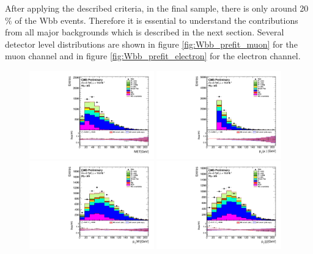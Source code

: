 After applying the described criteria, in the final sample, there is only around 20$\%$ of the Wbb events. Therefore it is essential to understand the contributions from all major backgrounds which is described in the next section. Several detector level distributions are shown in figure \ref{fig:Wbb_prefit_muon} for the muon channel and in figure \ref{fig:Wbb_prefit_electron} for the electron channel. 
\begin{figure}[htbp]
	\centering
		\includegraphics[width=0.48\textwidth]{Figures/Results/Muon/prefit/Wbb_GetMET_doQCD1.pdf}
		\includegraphics[width=0.48\textwidth]{Figures/Results/Muon/prefit/Wbb_vLepton_pt_doQCD1.pdf}
		\includegraphics[width=0.48\textwidth]{Figures/Results/Muon/prefit/Wbb_GetWpt_doQCD1.pdf}
		\includegraphics[width=0.48\textwidth]{Figures/Results/Muon/prefit/Wbb_H_pt_doQCD1.pdf}

\end{figure}

